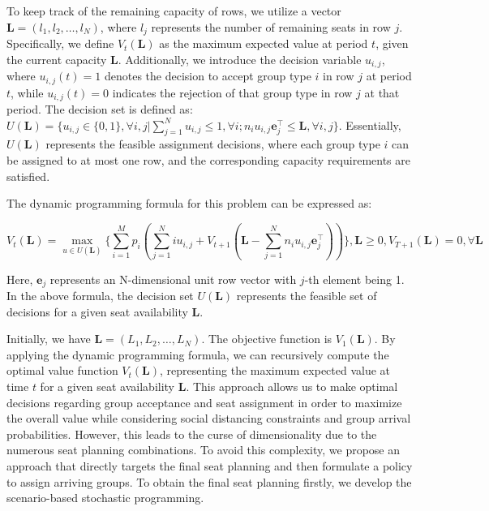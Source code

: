 To keep track of the remaining capacity of rows, we utilize a vector $\mathbf{L} = (l_1, l_2, \ldots, l_N)$, where $l_j$ represents the number of remaining seats in row $j$. Specifically, we define $V_t(\mathbf{L})$ as the maximum expected value at period $t$, given the current capacity $\mathbf{L}$. Additionally, we introduce the decision variable $u_{i,j}$, where $u_{i,j}(t) = 1$ denotes the decision to accept group type $i$ in row $j$ at period $t$, while $u_{i,j}(t) = 0$ indicates the rejection of that group type in row $j$ at that period. The decision set is defined as: $U(\mathbf{L}) = \{u_{i,j} \in\{0,1\}, \forall i,j| \sum_{j=1}^{N} u_{i,j} \leq 1, \forall i; n_{i}u_{i,j}\mathbf{e}_j^{\top} \leq \mathbf{L}, \forall i,j \}$. Essentially, $U(\mathbf{L})$ represents the feasible assignment decisions, where each group type $i$ can be assigned to at most one row, and the corresponding capacity requirements are satisfied.

The dynamic programming formula for this problem can be expressed as:

$$V_{t}(\mathbf{L}) = \max_{u \in U(\mathbf{L})}\{ \sum_{i=1}^{M} p_i ( \sum_{j=1}^{N} i u_{i,j} + V_{t+1}(\mathbf{L}- \sum_{j=1}^{N} n_i u_{i,j}\mathbf{e}_j^{\top} ))\}, \mathbf{L} \geq 0, V_{T+1}(\mathbf{L}) =0, \forall \mathbf{L}$$

Here, $\mathbf{e}_j$ represents an N-dimensional unit row vector with $j$-th element being 1. In the above formula, the decision set $U(\mathbf{L})$ represents the feasible set of decisions for a given seat availability $\mathbf{L}$. 

Initially, we have $\mathbf{L} = (L_1, L_2, \ldots, L_{N})$. The objective function is $V_1(\mathbf{L})$. By applying the dynamic programming formula, we can recursively compute the optimal value function $V_t(\mathbf{L})$, representing the maximum expected value at time $t$ for a given seat availability $\mathbf{L}$. This approach allows us to make optimal decisions regarding group acceptance and seat assignment in order to maximize the overall value while considering social distancing constraints and group arrival probabilities. However, this leads to the curse of dimensionality due to the numerous seat planning combinations. To avoid this complexity, we propose an approach that directly targets the final seat planning and then formulate a policy to assign arriving groups. To obtain the final seat planning firstly, we develop the scenario-based stochastic programming.


